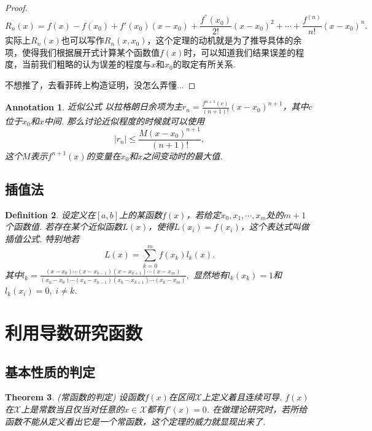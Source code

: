 \documentclass{article}
\newtheorem{theorem}{Theorem}[section]
\newtheorem{definition}[theorem]{Definition}
\newtheorem{annotation}[theorem]{Annotation}
\begin{document}
\begin{proof}
$$
R_n(x) = f(x) - f(x_0) + f'(x_0)(x-x_0) + \frac{f^{''}(x_0)}{2!}(x-x_0)^2 + \cdots + \frac{f^{(n)}}{n!}(x-x_0)^n.
$$
实际上$R_n(x)$也可以写作$R_n(x,x_0)$，这个定理的动机就是为了推导具体的余项，使得我们根据展开式计算某个函数值$f(x)$时，可以知道我们结果误差的程度，当前我们粗略的认为误差的程度与$x$和$x_0$的取定有所关系. 

不想推了，去看菲砖上构造证明，没怎么弄懂...
\end{proof}

\begin{annotation}
\rm {\color{red} 近似公式} 以拉格朗日余项为主$r_n = \frac{f^{n+1}(c)}{(n+1)!}(x-x_0)^{n+1}$，其中$c$位于$x_0$和$x$中间. 那么讨论近似程度的时候就可以使用
$$
|r_n| \leq \frac{M(x-x_0)^{n+1}}{(n+1)!},
$$
这个$M$表示$f^{n+1}(x)$的变量在$x_0$和$x$之间变动时的最大值. 
\end{annotation}

\subsection{插值法}

\begin{definition}
\rm 设定义在$[a,b]$上的某函数$f(x)$，若给定$x_0,x_1,\cdots,x_m$处的$m+1$个函数值. 若存在某个近似函数$L(x)$，使得$L(x_i) = f(x_i)$，这个表达式叫做{\color{red}插值公式}. 特别地若
$$
L(x) = \sum\limits_{k=0}^m f(x_k)l_k(x).
$$
其中$l_k = \frac{(x-x_0)\cdots(x-x_{k-1})(x-x_{k+1})\cdots(x-x_m)}{(x_k-x_0)\cdots(x_k-x_{k-1})(x_k-x_{k+1})\cdots(x_k-x_m)},$ 显然地有$l_k(x_k) = 1$和$l_k(x_i) = 0,\;i \neq k$.
\end{definition}


\newpage
\section{利用导数研究函数}

\subsection{基本性质的判定}

\begin{theorem}
\rm {\color{red} (常函数的判定)} 设函数$f(x)$在区间$\mathcal{X}$上定义着且连续可导. $f(x)$在$\mathcal{X}$上是常数当且仅当对任意的$x \in \mathcal{X}$都有$f'(x)=0$. {\color{blue} 在做理论研究时，若所给函数不能从定义看出它是一个常函数，这个定理的威力就显现出来了.}
\end{theorem}
\end{document}
